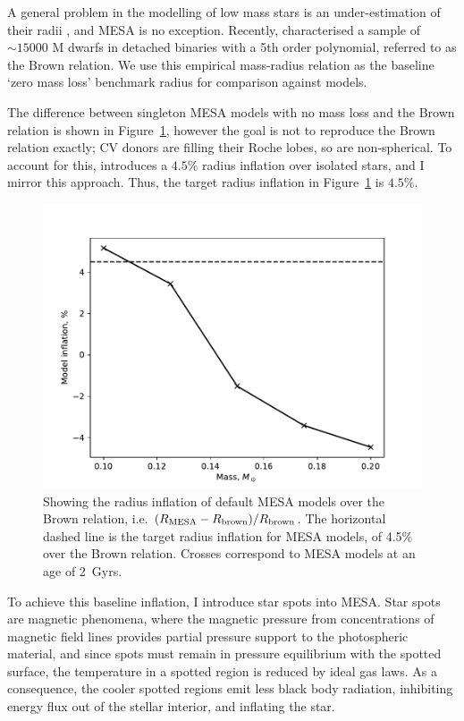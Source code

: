 A general problem in the modelling of low mass stars is an under-estimation of their radii \citep{lopez2005}, and MESA is no exception.
Recently, \citet{BrownPrep} characterised a sample of $\sim 15000$ M dwarfs in detached binaries with a 5th order polynomial, referred to as the Brown relation. We use this empirical mass-radius relation as the baseline `zero mass loss' benchmark radius for comparison against models.

The difference between singleton MESA models with no mass loss and the Brown relation is shown in Figure~\ref{fig:modelling:MESA inflation over Brown relation}, however the goal is not to reproduce the Brown relation exactly; CV donors are filling their Roche lobes, so are non-spherical.
To account for this, \citet{knigge11} introduces a $4.5\%$ radius inflation over isolated stars, and I mirror this approach. Thus, the target radius inflation in Figure~\ref{fig:modelling:MESA inflation over Brown relation} is $4.5\%$.
\begin{figure}
    \centering
    \includegraphics[width=\textwidth]{figures/modelling/MESA_inflation_over_brown.pdf}
    \caption{Showing the radius inflation of default MESA models over the Brown relation, i.e. $(R_{\rm MESA} - R_{\rm brown}) / R_{\rm brown}$. The horizontal dashed line is the target radius inflation for MESA models, of 4.5\% over the Brown relation. Crosses correspond to MESA models at an age of 2~Gyrs.}
    \label{fig:modelling:MESA inflation over Brown relation}
\end{figure}

To achieve this baseline inflation, I introduce star spots into MESA. Star spots are magnetic phenomena, where the magnetic pressure from concentrations of magnetic field lines provides partial pressure support to the photospheric material, and since spots must remain in pressure equilibrium with the spotted surface, the temperature in a spotted region is reduced by ideal gas laws. As a consequence, the cooler spotted regions emit less black body radiation, inhibiting energy flux out of the stellar interior, and inflating the star.

